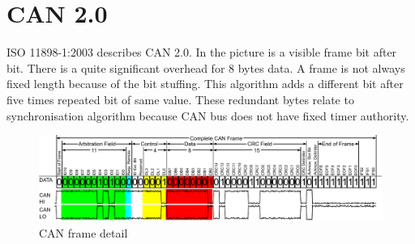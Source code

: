 \documentclass{ctuthesis}
\begin{document}
 \section{CAN 2.0}
ISO 11898-1:2003 describes CAN 2.0. In the picture is a visible frame bit after bit. There is a quite significant overhead for 8 bytes data. A frame is not always fixed length because of the bit stuffing. This algorithm adds a different bit after five times repeated bit of same value. These redundant bytes relate to synchronisation algorithm because CAN bus does not have fixed timer authority.
 \begin{figure}[H]
 \includegraphics[width=1\textwidth]{CAN-Bus-frame_in_base_format_without_stuffbits}
 \caption{CAN frame detail \cite{can_frame}}
 \end{figure}
\end{document}
